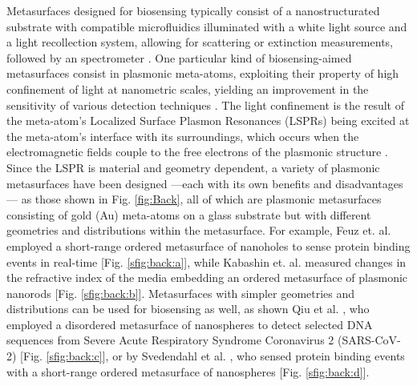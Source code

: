 Metasurfaces designed for biosensing typically consist of a nanostructurated substrate with compatible microfluidics illuminated with a white light source and a light recollection system, allowing for scattering or extinction measurements, followed by an spectrometer \cite{estevez_trends_2014,feuz_improving_2010}. One particular kind of  biosensing-aimed metasurfaces consist in plasmonic meta-atoms, exploiting their property of high confinement of light at nanometric scales, yielding an improvement in the sensitivity of various detection techniques \cite{khan_optical_2022}. The light confinement is the result of the meta-atom's Localized Surface Plasmon Resonances (LSPRs) being excited at the meta-atom's interface with its surroundings, which occurs when the electromagnetic fields couple to the free electrons of the plasmonic structure \cite{chen_review_2016,kim_plasmonic_2019,estevez_trends_2014}.  Since the LSPR is material and geometry dependent, a variety of plasmonic metasurfaces have been designed \cite{feuz_improving_2010,kabashin_plasmonic_2009,qiu_dual_2020,svedendahl_refractometric_2014} ---each with its own benefits and disadvantages \cite{chen_review_2016,estevez_trends_2014}--- as those shown in  Fig. \ref{fig:Back}, all of which are plasmonic metasurfaces consisting of gold (Au) meta-atoms on a glass substrate but with different geometries and distributions within the metasurface.  For example, Feuz et. al. \cite{feuz_improving_2010} employed a short-range ordered metasurface of nanoholes to sense protein binding events in real-time [Fig. \ref{sfig:back:a}], while  Kabashin et. al. \cite{kabashin_plasmonic_2009} measured  changes in the refractive index of the media embedding an ordered metasurface of plasmonic nanorods [Fig. \ref{sfig:back:b}].  Metasurfaces with simpler geometries and distributions can be used  for biosensing as well, as shown Qiu et al. \cite{qiu_dual_2020}, who employed a disordered metasurface of nanospheres to detect selected DNA sequences from Severe Acute Respiratory Syndrome Coronavirus 2 (SARS-CoV-2) [Fig. \ref{sfig:back:c}], or by Svedendahl et al. \cite{svedendahl_refractometric_2014}, who sensed protein binding events with a short-range ordered metasurface of nanospheres [Fig. \ref{sfig:back:d}].

